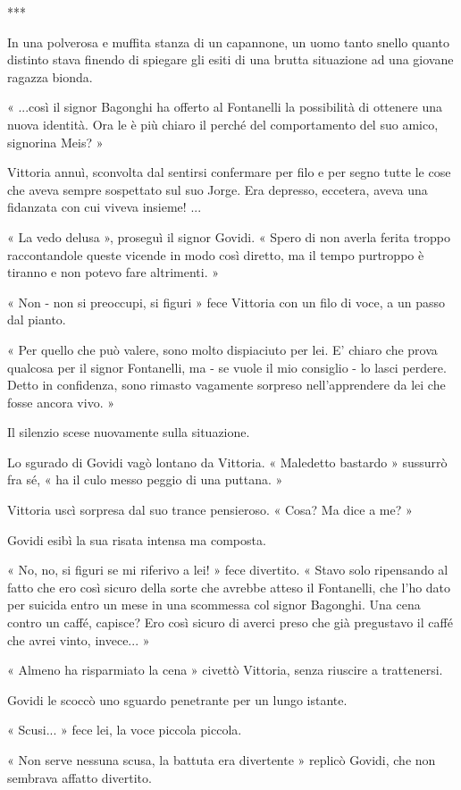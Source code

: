 ***

In una polverosa e muffita stanza di un capannone, un uomo tanto snello quanto distinto stava finendo di spiegare gli esiti di una brutta situazione ad una giovane ragazza bionda.

« ...così il signor Bagonghi ha offerto al Fontanelli la possibilità di ottenere una nuova identità. Ora le è più chiaro il perché del comportamento del suo amico, signorina Meis? »

Vittoria annuì, sconvolta dal sentirsi confermare per filo e per segno tutte le cose che aveva sempre sospettato sul suo Jorge. Era depresso, eccetera, aveva una fidanzata con cui viveva insieme! ...

« La vedo delusa », proseguì il signor Govidi. « Spero di non averla ferita troppo raccontandole queste vicende in modo così diretto, ma il tempo purtroppo è tiranno e non potevo fare altrimenti. »

« Non - non si preoccupi, si figuri » fece Vittoria con un filo di voce, a un passo dal pianto.

« Per quello che può valere, sono molto dispiaciuto per lei. E' chiaro che prova qualcosa per il signor Fontanelli, ma - se vuole il mio consiglio - lo lasci perdere. Detto in confidenza, sono rimasto vagamente sorpreso nell'apprendere da lei che fosse ancora vivo. »

Il silenzio scese nuovamente sulla situazione.

Lo sgurado di Govidi vagò lontano da Vittoria. « Maledetto bastardo » sussurrò fra sé, « ha il culo messo peggio di una puttana. »

Vittoria uscì sorpresa dal suo trance pensieroso. « Cosa? Ma dice a me?  »

Govidi esibì la sua risata intensa ma composta.

« No, no, si figuri se mi riferivo a lei! » fece divertito.  « Stavo solo ripensando al fatto che ero così sicuro della sorte che avrebbe atteso il Fontanelli, che l'ho dato per suicida entro un mese in una scommessa col signor Bagonghi. Una cena contro un caffé, capisce? Ero così sicuro di averci preso che già pregustavo il caffé che avrei vinto, invece... »

« Almeno ha risparmiato la cena » civettò Vittoria, senza riuscire a trattenersi.

Govidi le scoccò uno sguardo penetrante per un lungo istante.

« Scusi... » fece lei, la voce piccola piccola.

« Non serve nessuna scusa, la battuta era divertente » replicò Govidi, che non sembrava affatto divertito.

